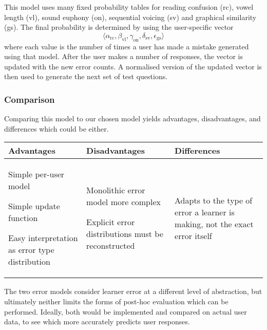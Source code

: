 \documentclass[11pt,a4paper]{article}
\begin{document}
This model uses many fixed probability tables for reading confusion (rc),
vowel length (vl), sound euphony (on), sequential voicing (sv) and graphical
similarity (gs). The final probability is determined by using the user-specific
vector
\[
\langle \alpha_\text{rc}, \beta_\text{vl}, \gamma_\text{on}, \delta_\text{sv},
\epsilon_\text{gs} \rangle
\]
where each value is the number of times a user has made a mistake generated
using that model. After the user makes a number of responses, the vector is
updated with the new error counts. A normalised version of the updated vector
is then used to generate the next set of test questions.

\subsubsection{Comparison}

Comparing this model to our chosen model yields advantages, disadvantages, and
differences which could be either.

\begin{center}
\begin{tabular}{p{4.5cm}p{4.5cm}p{4.5cm}}
\hline
{\bf Advantages} & {\bf Disadvantages} & {\bf Differences}\\
\hline
\begin{list}{}{\leftmargin=1em \itemindent=-0.3em \topsep=0em}
  \item Simple per-user model
  \item Simple update function
  \item Easy interpretation as error type distribution
\end{list}
&
\begin{list}{}{\leftmargin=1em \itemindent=-0.3em \topsep=0em}
  \item Monolithic error model more complex
  \item Explicit error distributions must be reconstructed
\end{list}
&
\begin{list}{}{\leftmargin=1em \itemindent=-0.3em \topsep=0em}
  \item Adapts to the type of error a learner is making, not the exact error
  itself
\end{list}
\\
\hline
\end{tabular}
\end{center}

The two error models consider learner error at a different level of
abstraction, but ultimately neither limits the forms of post-hoc evaluation
which can be performed. Ideally, both would be implemented and compared on
actual user data, to see which more accurately predicts user responses. 
\end{document}
